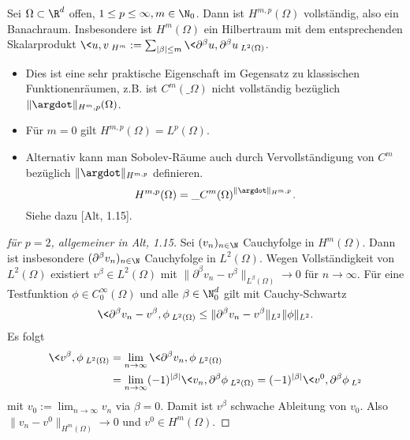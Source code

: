 \begin{st} \label{3.5}
	Sei $\Omega \subset \R^d$ offen, $1 \le p \le \infty, m \in \N_0$.
	Dann ist $H^{m,p}(\Omega)$ vollständig, also ein Banachraum.
	Insbesondere ist $H^m(\Omega)$ ein Hilbertraum mit dem entsprechenden Skalarprodukt $\<u,v\>_{H^m} := \sum_{|\beta| \le m} \<\partial^\beta u, \partial^\beta u\>_{L^2(\Omega)}$.
	\begin{note}
		\begin{itemize}
			\item
				Dies ist eine sehr praktische Eigenschaft im Gegensatz zu klassischen Funktionenräumen, z.B. ist $C^m(\_\Omega)$ nicht vollständig bezüglich $\|\argdot\|_{H^m,p}(\Omega)$.
			\item
				Für $m = 0$ gilt $H^{m,p}(\Omega) = L^p(\Omega)$.
			\item
				Alternativ kann man Sobolev-Räume auch durch Vervollständigung von $C^m$ bezüglich $\|\argdot\|_{H^{m,p}}$ definieren.
				\[
					H^{m,p}(\Omega) = \_{C^m(\Omega)}^{\|\argdot\|_{H^{m,p}}}.
				\]
				Siehe dazu [Alt, 1.15].
		\end{itemize}
	\end{note}
	\begin{proof}[für $p=2$, allgemeiner in Alt, 1.15]
		Sei $(v_n)_{n\in\N}$ Cauchyfolge in $H^m(\Omega)$.
		Dann ist insbesondere $(\partial^\beta v_n)_{n\in\N}$ Cauchyfolge in $L^2(\Omega)$.
		Wegen Vollständigkeit von $L^2(\Omega)$ existiert $v^\beta \in L^2(\Omega)$ mit $\|\partial^\beta v_n - v^\beta\|_{L^\beta(\Omega)} \to 0$ für $n \to \infty$.
		Für eine Testfunktion $\phi \in C_0^\infty(\Omega)$ und alle $\beta \in \N_0^d$ gilt mit Cauchy-Schwartz
		\begin{align*}
			\<\partial^\beta v_n - v^\beta, \phi\>_{L^2(\Omega)}
			\le \|\partial^\beta v_n - v^\beta\|_{L^2}\|\phi\|_{L^2}.
		\end{align*}
		Es folgt
		\begin{align*}
			\<v^\beta, \phi\>_{L^2(\Omega)}
			&= \lim_{n\to\infty} \<\partial^\beta v_n, \phi\>_{L^2(\Omega)} \\
			&= \lim_{n\to\infty} (-1)^{|\beta|} \<v_n, \partial^\beta \phi\>_{L^2(\Omega)}
			= (-1)^{|\beta|} \<v^0, \partial^\beta \phi\>_{L^2}
		\end{align*}
		mit $v_0 := \lim_{n\to\infty} v_n$ via $\beta = 0$.
		Damit ist $v^\beta$ schwache Ableitung von $v_0$.
		Also $\|v_n - v^0\|_{H^m(\Omega)} \to 0$ und $v^0 \in H^m(\Omega)$.
	\end{proof}
\end{st}

